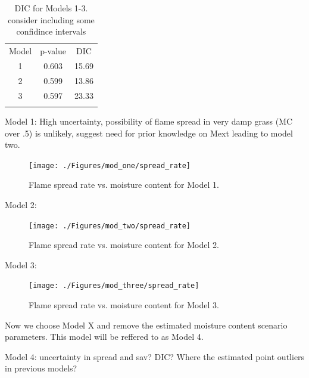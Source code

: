 \documentclass[11pt]{article}
\begin{document}
\begin{table}[h]
\caption{DIC for Models 1-3. consider including some confidince intervals}
\begin{center}
  \begin{tabular}{ccc}
    \hline\noalign{\smallskip}
    Model & p-value & DIC \\
    \noalign{\smallskip}\hline\noalign{\smallskip}
    1 & 0.603 & 15.69 \\
    2 & 0.599 & 13.86 \\ 
    3 & 0.597 & 23.33 \\ 
    \noalign{\smallskip}\hline
  \end{tabular}
\end{center}
\label{tab:dic}
\end{table}

Model 1: High uncertainty, possibility of flame spread in very damp grass (MC over .5) is unlikely, suggest need for prior knowledge on Mext leading to model two.

\begin{figure}[h]
\begin{center}
\texttt{[image: ./Figures/mod\_one/spread\_rate]}
\end{center}
\caption{Flame spread rate vs. moisture content for Model 1.}
\label{fig:m1_rate} 
\end{figure}

Model 2:

\begin{figure}[h]
\begin{center}
\texttt{[image: ./Figures/mod\_two/spread\_rate]}
\end{center}
\caption{Flame spread rate vs. moisture content for Model 2.}
\label{fig:m2_rate} 
\end{figure}

Model 3:

\begin{figure}[h]
\begin{center}
\texttt{[image: ./Figures/mod\_three/spread\_rate]}
\end{center}
\caption{Flame spread rate vs. moisture content for Model 3.}
\label{fig:m3_rate} 
\end{figure}



Now we choose Model X and remove the estimated moisture content scenario parameters. This model will be reffered to as Model 4.

Model 4: uncertainty in spread and sav? DIC? Where the estimated point outliers in previous models?
\end{document}
